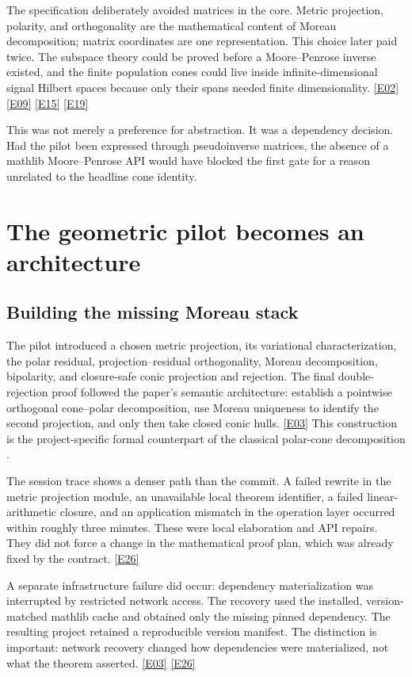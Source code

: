 \documentclass[11pt,a4paper]{article}
\newcommand{\ev}[1]{%
  \hyperref[ev:#1]{\textcolor{ReportBlue}{\textsf{\scriptsize[#1]}}}}
\begin{document}
The specification deliberately avoided matrices in the core. Metric projection,
polarity, and orthogonality are the mathematical content of Moreau decomposition;
matrix coordinates are one representation. This choice later paid twice. The
subspace theory could be proved before a Moore--Penrose inverse existed, and the
finite population cones could live inside infinite-dimensional signal Hilbert
spaces because only their spans needed finite dimensionality. \ev{E02}\ev{E09}\ev{E15}\ev{E19}

This was not merely a preference for abstraction. It was a dependency decision. Had
the pilot been expressed through pseudoinverse matrices, the absence of a mathlib
Moore--Penrose API would have blocked the first gate for a reason unrelated to the
headline cone identity.

\section{The geometric pilot becomes an architecture}
\label{sec:pilot}

\subsection{Building the missing Moreau stack}

The pilot introduced a chosen metric projection, its variational characterization,
the polar residual, projection--residual orthogonality, Moreau decomposition,
bipolarity, and closure-safe conic projection and rejection. The final double-
rejection proof followed the paper's semantic architecture: establish a pointwise
orthogonal cone--polar decomposition, use Moreau uniqueness to identify the second
projection, and only then take closed conic hulls. \ev{E03}
This construction is the project-specific formal counterpart of the classical
polar-cone decomposition \cite{moreau1962,bauschke2017}.

The session trace shows a denser path than the commit. A failed rewrite in the metric
projection module, an unavailable local theorem identifier, a failed linear-
arithmetic closure, and an application mismatch in the operation layer occurred
within roughly three minutes. These were local elaboration and API repairs. They did
not force a change in the mathematical proof plan, which was already fixed by the
contract. \ev{E26}

A separate infrastructure failure did occur: dependency materialization was
interrupted by restricted network access. The recovery used the installed,
version-matched mathlib cache and obtained only the missing pinned dependency. The
resulting project retained a reproducible version manifest. The distinction is
important: network recovery changed how dependencies were materialized, not what the
theorem asserted. \ev{E03}\ev{E26}
\end{document}
